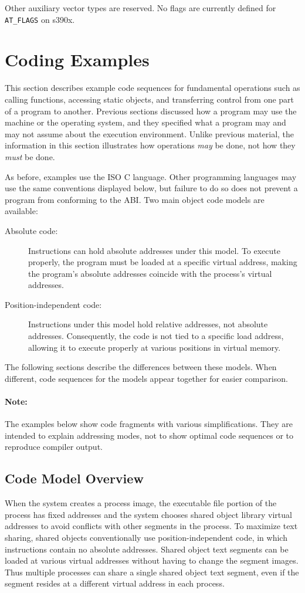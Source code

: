 \documentclass[english,11pt,twoside,toc=bib,toc=idx]{scrreprt}
\newcommand{\ABINAME}{s390x}
\newcommand{\ABINAME}{s390}
\begin{document}
Other auxiliary vector types are reserved.  No flags are currently
defined for \texttt{AT\_FLAGS} on \ABINAME{}.

\section{Coding Examples}
\label{codingexamples}
This section describes example code sequences for fundamental
operations such as calling functions, accessing static objects, and
transferring control from one part of a program to another.  Previous
sections discussed how a program may use the machine or the operating
system, and they specified what a program may and may not assume about
the execution environment.  Unlike previous material, the information
in this section illustrates how operations \emph{may} be done,
not how they \emph{must} be done.

As before, examples use the ISO C language.  Other programming
languages may use the same conventions displayed below, but failure to
do so does not prevent a program from conforming to the ABI\@.  Two main
object code models are available:
\begin{description}
\item[Absolute code:] Instructions can hold absolute addresses under
  this model.  To execute properly, the program must be loaded at a
  specific virtual address, making the program's absolute addresses
  coincide with the process's virtual addresses.
\item[Position-independent code:] Instructions under this model hold
  relative addresses, not absolute addresses.  Consequently, the code
  is not tied to a specific load address, allowing it to execute
  properly at various positions in virtual memory.
\end{description}

The following sections describe the differences between these models.
When different, code sequences for the models appear together for
easier comparison.

\paragraph{Note:}
The examples below show code fragments with various simplifications.
They are intended to explain addressing modes, not to show optimal
code sequences or to reproduce compiler output.

\subsection{Code Model Overview}
When the system creates a process image, the executable file
portion of the process has fixed addresses and the system chooses
shared object library virtual addresses to avoid conflicts with other
segments in the process.  To maximize text sharing, shared objects
conventionally use position-independent code, in which instructions
contain no absolute addresses.  Shared object text segments can be
loaded at various virtual addresses without having to change the
segment images.  Thus multiple processes can share a single shared
object text segment, even if the segment resides at a different
virtual address in each process.
\end{document}
